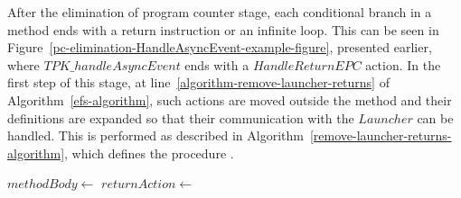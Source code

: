 After the elimination of program counter stage, each conditional
branch in a method ends with a return instruction or an infinite loop.
This can be seen in
Figure~\ref{pc-elimination-HandleAsyncEvent-example-figure}, presented
earlier, where $TPK\_handleAsyncEvent$ ends with a $HandleReturnEPC$
action.
In the first step of this stage, at
line~\ref{algorithm-remove-launcher-returns} of
Algorithm~\ref{efs-algorithm}, such actions are moved outside the
method and their definitions are expanded so that their communication
with the $Launcher$ can be handled.
This is performed as described in
Algorithm~\ref{remove-launcher-returns-algorithm}, which defines the
procedure .
\begin{algorithm}[ht]
  \begin{algorithmic}[1]
    \label{algorithm-method-single-return-loop}
    \State $methodBody \gets$ 
    \State $returnAction \gets$ 
    \label{algorithm-determine-return-action}   
    \State {}
    \label{algorithm-introduce-infinite-loop-returns}
    \State {}
    \label{algorithm-distribute-returns}

    \State {}
    \label{algorithm-remove-returns-introduce-method-action}
    \State {}
    \label{algorithm-eliminate-returns-copy-method-out}


\end{algorithmic}
\end{algorithm}
